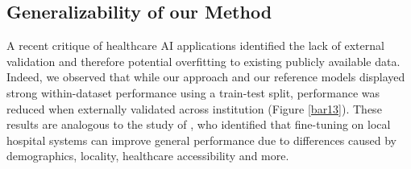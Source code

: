 \documentclass[pmlr]{jmlr}%
\begin{document}
{%



\subsection{Generalizability of our Method}

A recent critique of healthcare AI applications identified the lack of external validation and therefore potential overfitting to existing publicly available data. Indeed, we observed that while our approach and our reference models displayed strong within-dataset performance using a train-test split, performance was reduced when externally validated across institution (Figure \ref{bar13}).
These results are analogous to the study of \citep{jiang2023health}, who identified that fine-tuning on local hospital systems can improve general performance due to differences caused by demographics, locality, healthcare accessibility and more. 

}
\end{document}
